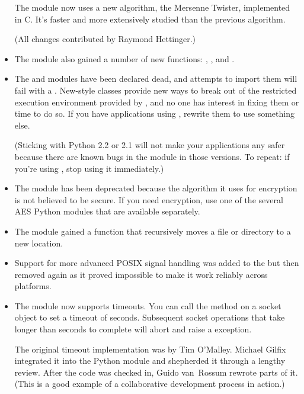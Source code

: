 \documentclass{howto}
\begin{document}
\begin{itemize}
The  module now uses a new algorithm, the Mersenne
Twister, implemented in C.  It's faster and more extensively studied
than the previous algorithm.

(All changes contributed by Raymond Hettinger.)

\item The  module also gained a number of new
functions: ,
, and .

\item The  and  modules have been
declared dead, and attempts to import them will fail with a
.  New-style classes provide new ways to break
out of the restricted execution environment provided by
, and no one has interest in fixing them or time to do
so.  If you have applications using , rewrite them to
use something else.

(Sticking with Python 2.2 or 2.1 will not make your applications any
safer because there are known bugs in the  module in
those versions.  To repeat: if you're using , stop using
it immediately.)

\item The  module has been deprecated because the 
  algorithm it uses for encryption is not believed to be secure.  If
  you need encryption, use one of the several AES Python modules
  that are available separately.

\item The  module gained a  function that recursively moves a file or directory to a new
location.

\item Support for more advanced POSIX signal handling was added
to the  but then removed again as it proved impossible
to make it work reliably across platforms.

\item The  module now supports timeouts.  You
can call the  method on a socket object to
set a timeout of  seconds.  Subsequent socket operations that
take longer than  seconds to complete will abort and raise a
 exception.

The original timeout implementation was by Tim O'Malley.  Michael
Gilfix integrated it into the Python  module and
shepherded it through a lengthy review.  After the code was checked
in, Guido van~Rossum rewrote parts of it.  (This is a good example of
a collaborative development process in action.)


\end{itemize}
\end{document}
